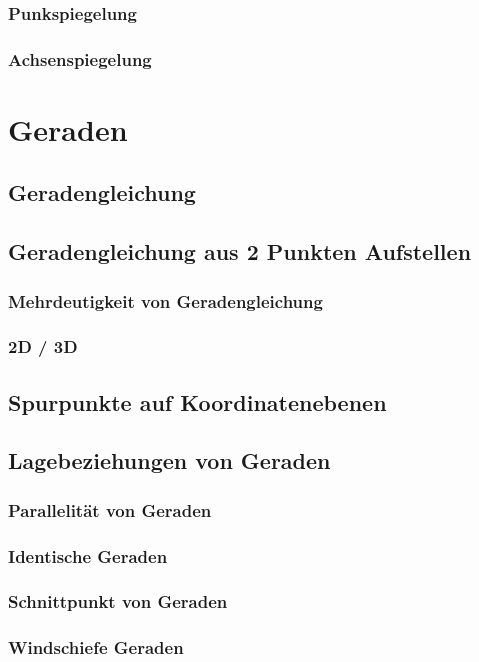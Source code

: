 \subsubsection*{Punkspiegelung}
\subsubsection*{Achsenspiegelung}

\section{Geraden}
\subsection{Geradengleichung}
\subsection{Geradengleichung aus 2 Punkten Aufstellen}
\subsubsection{Mehrdeutigkeit von Geradengleichung}
\subsubsection{2D / 3D}
\subsection{Spurpunkte auf Koordinatenebenen}
\subsection{Lagebeziehungen von Geraden}
\subsubsection{Parallelität von Geraden}
\subsubsection{Identische Geraden}
\subsubsection{Schnittpunkt von Geraden}
\subsubsection{Windschiefe Geraden}

